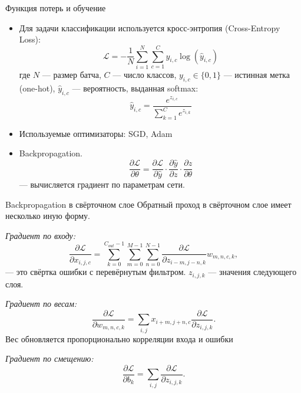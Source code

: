 \documentclass[notheorems, handout]{beamer}
\begin{document}
\begin{frame}{Функция потерь и обучение}
    \begin{itemize}
        \item Для задачи классификации используется кросс-энтропия (Cross-Entropy Loss):
        \[
        \mathcal{L} = -\frac{1}{N} \sum_{i=1}^{N} \sum_{c=1}^{C} y_{i,c} \log(\hat{y}_{i,c})
        \]
        где $N$ — размер батча, $C$ — число классов, $y_{i,c} \in \{0,1\}$ — истинная метка (one-hot), $\hat{y}_{i,c}$ — вероятность, выданная softmax:
        \[
            \hat{y}_{i,c} = \frac{e^{z_{i,c}}}{\sum_{k=1}^{C} e^{z_{i,k}}}
        \]
        \item Используемые оптимизаторы: SGD, Adam
        \item Backpropagation.
        \[
            \frac{\partial \mathcal{L}}{\partial \theta} = \frac{\partial \mathcal{L}}{\partial \hat{y}} 
            \cdot \frac{\partial \hat{y}}{\partial z} 
            \cdot \frac{\partial z}{\partial \theta}
        \]
        — вычисляется градиент по параметрам сети.
    \end{itemize}
\end{frame}

\begin{frame}{Backpropagation в свёрточном слое}
    Обратный проход в свёрточном слое имеет несколько иную форму.

    \textit{Градиент по входу:}
    \[
    \frac{\partial \mathcal{L}}{\partial x _{i, j, c}} 
    = \sum _{k = 0} ^{C _{out} - 1} \sum _{m = 0} ^{M - 1} \sum _{n = 0} ^{N - 1} \frac{\partial \mathcal{L}}{\partial z _{i - m, j - n, k}} w _{m, n, c, k},
    \]
    --- это свёртка ошибки с перевёрнутым фильтром. $z _{i, j, k}$ --- значения следующего слоя.

    \textit{Градиент по весам:}
    \[
    \frac{\partial \mathcal{L}}{\partial w _{m, n, c, k}} 
    = \sum _{i, j} x _{i + m, j+n, c} \frac{\partial \mathcal{L}}{\partial z _{i, j, k}}.
    \]
    Вес обновляется пропорционально корреляции входа и ошибки

    \textit{Градиент по смещению:}
    \[
    \frac{\partial \mathcal{L}}{\partial b _k} 
    = \sum _{i, j} \frac{\partial \mathcal{L}}{\partial z _{i, j, k}}.
    \]
\end{frame}
\end{document}
